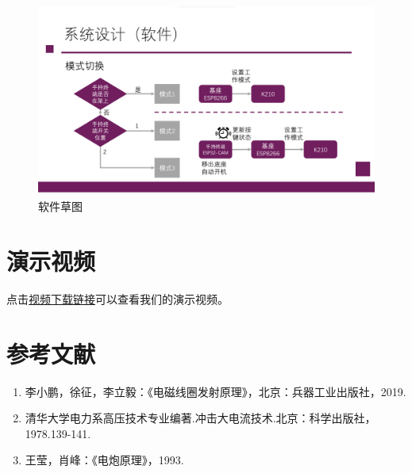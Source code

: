 \documentclass{article}
\begin{document}
\begin{figure}
\begin{minipage}[b]{.45\linewidth}
\end{minipage}
\begin{minipage}[b]{.45\linewidth}
    \includegraphics[width=\linewidth]{imgs/soft4.png}
\end{minipage}
\caption{软件草图}
\label{soft}
\end{figure}
\appendix
\section{演示视频}
点击\href{https://cloud.tsinghua.edu.cn/f/abc058fe22bd465c998f/}{视频下载链接}可以查看我们的演示视频。
\section{参考文献}
\begin{enumerate}
    \item 李小鹏，徐征，李立毅：《电磁线圈发射原理》，北京：兵器工业出版社，2019.
    \item 清华大学电力系高压技术专业编著.冲击大电流技术.北京：科学出版社，1978.139-141.
    \item 王莹，肖峰：《电炮原理》，1993.
\end{enumerate}
\end{document}

